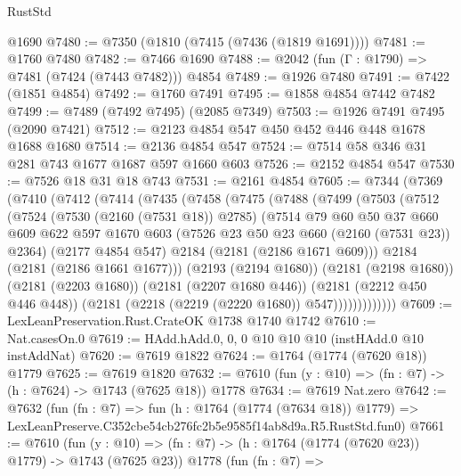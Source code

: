 \begin{lexlean}{RustStd}
\begin{coremodule}
    @1690
@7480 := @7350 (@1810 (@7415 (@7436 (@1819 @1691))))
@7481 := @1760 @7480
@7482 := @7466 @1690
@7488 := @2042 (fun (Γ : @1790) => @7481 (@7424 (@7443 @7482))) @4854
@7489 := @1926 @7480
@7491 := @7422 (@1851 @4854)
@7492 := @1760 @7491
@7495 := @1858 @4854 @7442 @7482
@7499 := @7489 (@7492 @7495) (@2085 @7349)
@7503 := @1926 @7491 @7495 (@2090 @7421)
@7512 := @2123 @4854 @547 @450 @452 @446 @448 @1678 @1688 @1680
@7514 := @2136 @4854 @547
@7524 := @7514 @58 @346 @31 @281 @743 @1677 @1687 @597 @1660 @603
@7526 := @2152 @4854 @547
@7530 := @7526 @18 @31 @18 @743
@7531 := @2161 @4854
@7605 := @7344
    (@7369
      (@7410
        (@7412
          (@7414
            (@7435
              (@7458
                (@7475
                  (@7488
                    (@7499
                      (@7503
                        (@7512
                          (@7524
                            (@7530 (@2160 (@7531 @18)) @2785)
                            (@7514
                              @79
                              @60
                              @50
                              @37
                              @660
                              @609
                              @622
                              @597
                              @1670
                              @603
                              (@7526 @23 @50 @23 @660 (@2160 (@7531 @23)) @2364)
                              (@2177 @4854 @547)
                              @2184
                              (@2181 (@2186 @1671 @609)))
                            @2184
                            (@2181 (@2186 @1661 @1677)))
                          (@2193 (@2194 @1680))
                          (@2181 (@2198 @1680))
                          (@2181 (@2203 @1680))
                          (@2181 (@2207 @1680 @446))
                          (@2181 (@2212 @450 @446 @448))
                          (@2181 (@2218 (@2219 (@2220 @1680)) @547)))))))))))))
@7609 := LexLeanPreservation.Rust.CrateOK @1738 @1740 @1742
@7610 := Nat.casesOn.{0}
@7619 := HAdd.hAdd.{0, 0, 0} @10 @10 @10 (instHAdd.{0} @10 instAddNat)
@7620 := @7619 @1822
@7624 := @1764 (@1774 (@7620 @18)) @1779
@7625 := @7619 @1820
@7632 := @7610 (fun (y : @10) => (fn : @7) -> (h : @7624) -> @1743 (@7625 @18)) @1778
@7634 := @7619 Nat.zero
@7642 := @7632
    (fun (fn : @7) =>
    fun (h : @1764 (@1774 (@7634 @18)) @1779) =>
    LexLeanPreserve.C352cbe54cb276fc2b5e9585f14ab8d9a.R5.RustStd.fun0)
@7661 := @7610
    (fun (y : @10) => (fn : @7) -> (h : @1764 (@1774 (@7620 @23)) @1779) -> @1743 (@7625 @23))
    @1778
    (fun (fn : @7) =>

\end{coremodule}
\end{lexlean}
